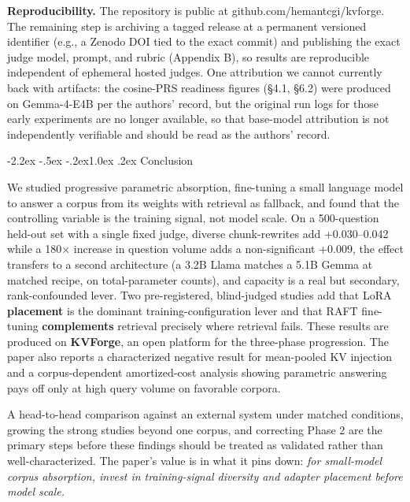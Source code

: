 \documentclass[10pt,twocolumn]{article}
\makeatletter
\renewcommand\section{\@startsection{section}{1}{\z@}%
  {-2.2ex \@plus -.5ex \@minus -.2ex}{1.0ex \@plus .2ex}%
  {\normalfont\large\bfseries}}
\makeatother
\begin{document}
\textbf{Reproducibility.} The repository is public at github.com/hemantcgi/kvforge. The remaining step is archiving a tagged release at a permanent versioned identifier (e.g., a Zenodo DOI tied to the exact commit) and publishing the exact judge model, prompt, and rubric (Appendix B), so results are reproducible independent of ephemeral hosted judges. One attribution we cannot currently back with artifacts: the cosine-PRS readiness figures (§4.1, §6.2) were produced on Gemma-4-E4B per the authors' record, but the original run logs for those early experiments are no longer available, so that base-model attribution is not independently verifiable and should be read as the authors' record.

\hypertarget{conclusion}{%
\section{Conclusion}\label{conclusion}}

We studied progressive parametric absorption, fine-tuning a small language model to answer a corpus from its weights with retrieval as fallback, and found that the controlling variable is the training signal, not model scale. On a 500-question held-out set with a single fixed judge, diverse chunk-rewrites add +0.030--0.042 while a 180× increase in question volume adds a non-significant +0.009, the effect transfers to a second architecture (a 3.2B Llama matches a 5.1B Gemma at matched recipe, on total-parameter counts), and capacity is a real but secondary, rank-confounded lever. Two pre-registered, blind-judged studies add that LoRA \textbf{placement} is the dominant training-configuration lever and that RAFT fine-tuning \textbf{complements} retrieval precisely where retrieval fails. These results are produced on \textbf{KVForge}, an open platform for the three-phase progression. The paper also reports a characterized negative result for mean-pooled KV injection and a corpus-dependent amortized-cost analysis showing parametric answering pays off only at high query volume on favorable corpora.

A head-to-head comparison against an external system under matched conditions, growing the strong studies beyond one corpus, and correcting Phase 2 are the primary steps before these findings should be treated as validated rather than well-characterized. The paper's value is in what it pins down: \emph{for small-model corpus absorption, invest in training-signal diversity and adapter placement before model scale.}
\end{document}
